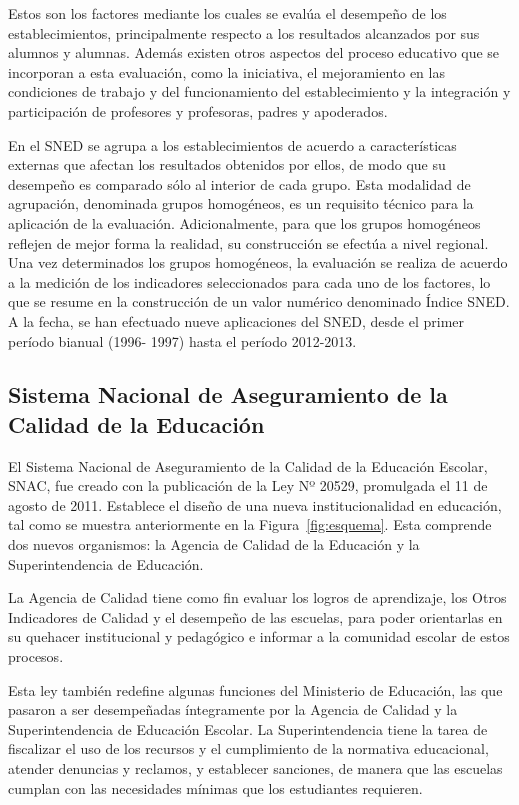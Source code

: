 Estos son los factores mediante los cuales se evalúa el desempeño de los establecimientos, principalmente respecto a los resultados alcanzados por sus alumnos y alumnas. Además existen otros aspectos del proceso educativo que se incorporan a esta evaluación, como la iniciativa, el mejoramiento en las condiciones de trabajo y del funcionamiento del establecimiento y la integración y participación de profesores y profesoras, padres y apoderados.

En el SNED se agrupa a los establecimientos de acuerdo a características externas que afectan los resultados obtenidos por ellos, de modo que su desempeño es comparado sólo al interior de cada grupo. Esta modalidad de agrupación, denominada grupos homogéneos, es un requisito técnico para la aplicación de la evaluación. Adicionalmente, para que los grupos homogéneos reflejen de mejor forma la realidad, su construcción se efectúa a nivel regional. Una vez determinados los grupos homogéneos, la evaluación se realiza de acuerdo a la medición de los indicadores seleccionados para cada uno de los factores, lo que se resume en la construcción de un valor numérico denominado Índice SNED.
A la fecha, se han efectuado nueve aplicaciones del SNED, desde el primer período bianual (1996- 1997) hasta el período 2012-2013. \cite{sned}

\subsection{Sistema Nacional de Aseguramiento de la Calidad de la Educación}
El Sistema Nacional de Aseguramiento de la Calidad de la Educación Escolar, SNAC, fue creado con la publicación de la Ley Nº 20529, promulgada el 11 de agosto de 2011. Establece el diseño de una nueva institucionalidad en educación, tal como se muestra anteriormente en la Figura~\ref{fig:esquema}. Esta comprende dos nuevos organismos: la Agencia de Calidad de la Educación y la Superintendencia de Educación.

La Agencia de Calidad tiene como fin evaluar los logros de aprendizaje, los Otros Indicadores de Calidad y el desempeño de las escuelas, para poder orientarlas en su quehacer institucional y pedagógico e informar a la comunidad escolar de estos procesos.

Esta ley también redefine algunas funciones del Ministerio de Educación, las que pasaron a ser desempeñadas íntegramente por la Agencia de Calidad y la Superintendencia de Educación Escolar. La Superintendencia tiene la tarea de fiscalizar el uso de los recursos y el cumplimiento de la normativa educacional, atender denuncias y reclamos, y establecer sanciones, de manera que las escuelas cumplan con las necesidades mínimas que los estudiantes requieren.

